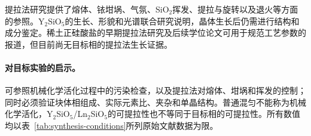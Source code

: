 提拉法研究提供了熔体、铱坩埚、气氛、SiO$_2$挥发、提拉与旋转以及退火等方面的参照。Y$_2$SiO$_5$的生长、形貌和光谱联合研究说明，晶体生长后仍需进行结构和成分鉴定。稀土正硅酸盐的早期提拉法研究及后续学位论文可用于规范工艺参数的报道，但目前尚无目标相的提拉法生长证据\cite{pang2005study,shoudu1999czochralski,brandle1986czochralski,alizadeh2021spectroscopy}。

\paragraph{对目标实验的启示。}可参照机械化学活化过程中的污染检查，以及提拉法对熔体、坩埚和挥发的控制；同时必须验证块体相组成、实际元素比、夹杂和单晶结构。普通混匀不能称为机械化学活化，Y$_2$SiO$_5$\slash Ln$_2$SiO$_5$的可提拉性也不等同于目标相的可提拉性。所有数值均以表~\ref{tab:synthesis-conditions}\CJKecglue{}所列原始文献数据为限。
